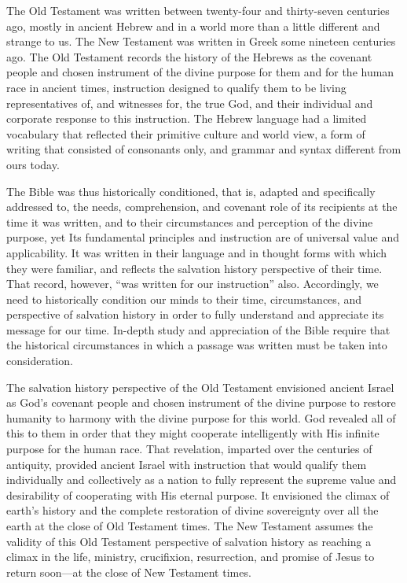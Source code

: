 The Old Testament was written between twenty-four and thirty-seven centuries
ago, mostly in ancient Hebrew and in a world more than a little different
and strange to us. The New Testament was written in Greek some nineteen
centuries ago. The Old Testament records the history of the Hebrews as the 
covenant people and chosen instrument of the divine purpose for them and for
the human race in ancient times, instruction designed to qualify them to be
living representatives of, and witnesses for, the true God, and their
individual and corporate response to this instruction. The Hebrew language
had a limited vocabulary that reflected their primitive culture and world
view, a form of writing that consisted of consonants only, and grammar and
syntax different from ours today.

The Bible was thus historically conditioned,\cite{55} that is, adapted and
specifically addressed to, the needs, comprehension, and covenant role of
its recipients at the time it was written, and to their circumstances and
perception of the divine purpose, yet Its fundamental principles and
instruction are of universal value and applicability. It was written in
their language and in thought forms with which they were familiar, and
reflects the salvation history perspective of their time. That record,
however, ``was written for our instruction'' also. Accordingly, we need to
historically condition our minds to their time, circumstances, and
perspective of salvation history in order to fully understand and appreciate
its message for our time. In-depth study and appreciation of the Bible
require that the historical circumstances in which a passage was written
must be taken into consideration.

The salvation history perspective of the Old Testament envisioned ancient
Israel as God's covenant people and chosen instrument of the divine purpose
to restore humanity to harmony with the divine purpose for this world. God
revealed all of this to them in order that they might cooperate
intelligently with His infinite purpose for the human race. That revelation,
imparted over the centuries of antiquity, provided ancient Israel with
instruction that would qualify them individually and collectively as a
nation to fully represent the supreme value and desirability of cooperating
with His eternal purpose. It envisioned the climax of earth's history and
the complete restoration of divine sovereignty over all the earth at the
close of Old Testament times. The New Testament assumes the validity of this
Old Testament perspective of salvation history as reaching a climax in the
life, ministry, crucifixion, resurrection, and promise of Jesus to return
soon---at the close of New Testament times.


